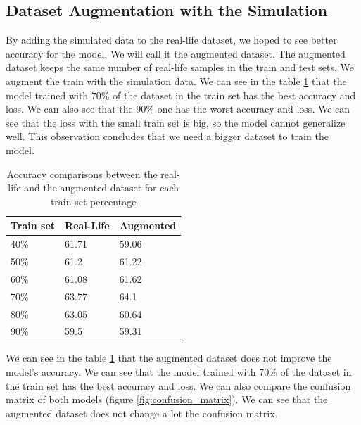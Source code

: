 \subsection{Dataset Augmentation with the Simulation}
\label{sec:augmentation_results}

By adding the simulated data to the real-life dataset, we hoped to see better accuracy for the model. We will call it the augmented dataset. The augmented dataset keeps the same number of real-life samples in the train and test sets. We augment the train with the simulation data. We can see in the table \ref{tab:neural_network__augmented_results} that the model trained with 70\% of the dataset in the train set has the best accuracy and loss. We can also see that the 90\% one has the worst accuracy and loss. We can see that the loss with the small train set is big, so the model cannot generalize well. This observation concludes that we need a bigger dataset to train the model.

\begin{table}[H]
    \centering
    \begin{tabular}{|l|l|l|}
    \hline
    \textbf{Train set} & \textbf{Real-Life} & \textbf{Augmented} \\ \hline
    40\%               & 61.71              & 59.06         \\ \hline
    50\%               & 61.2               & 61.22         \\ \hline
    60\%               & 61.08              & 61.62         \\ \hline
    70\%               & 63.77              & 64.1          \\ \hline
    80\%               & 63.05              & 60.64         \\ \hline
    90\%               & 59.5               & 59.31         \\ \hline
    \end{tabular}
    \caption{Accuracy comparisons between the real-life and the augmented dataset for each train set percentage}
    \label{tab:neural_network__augmented_results}
\end{table}

We can see in the table \ref{tab:neural_network__augmented_results} that the augmented dataset does not improve the model's accuracy. We can see that the model trained with 70\% of the dataset in the train set has the best accuracy and loss. We can also compare the confusion matrix of both models (figure \ref{fig:confusion_matrix}). We can see that the augmented dataset does not change a lot the confusion matrix.

